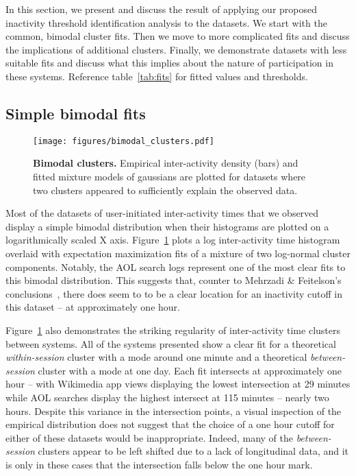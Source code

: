 In this section, we present and discuss the result of applying our proposed inactivity threshold identification analysis to the datasets.  We start with the common, bimodal cluster fits.  Then we move to more complicated fits and discuss the implications of additional clusters.  Finally, we demonstrate datasets with less suitable fits and discuss what this implies about the nature of participation in these systems.  Reference table~\ref{tab:fits} for fitted values and thresholds.

\subsection{Simple bimodal fits}
\begin{figure}
\centering
\texttt{[image: figures/bimodal\_clusters.pdf]}
\caption{
    \textbf{Bimodal clusters.} Empirical inter-activity density (bars) and fitted mixture models of gaussians are plotted for datasets where two clusters appeared to sufficiently explain the observed data.
}
\label{fig:bimodal_clusters}
\end{figure}
Most of the datasets of user-initiated inter-activity times that we observed display a simple bimodal distribution when their histograms are plotted on a logarithmically scaled X axis.  Figure~\ref{fig:bimodal_clusters} plots a log inter-activity time histogram overlaid with expectation maximization fits of a mixture of two log-normal cluster components.  Notably, the AOL search logs represent one of the most clear fits to this bimodal distribution.  This suggests that, counter to Mehrzadi \& Feitelson's conclusions~\cite{mehrzadi2012onextracting}, there does seem to to be a clear location for an inactivity cutoff in this dataset -- at approximately one hour.

Figure~\ref{fig:bimodal_clusters} also demonstrates the striking regularity of inter-activity time clusters between systems.  All of the systems presented show a clear fit for a theoretical \emph{within-session} cluster with a mode around one minute and a theoretical \emph{between-session} cluster with a mode at one day.  Each fit intersects at approximately one hour -- with Wikimedia app views displaying the lowest intersection at 29 minutes while AOL searches display the highest intersect at 115 minutes -- nearly two hours.   Despite this variance in the intersection points, a visual inspection of the empirical distribution does not suggest that the choice of a one hour cutoff for either of these datasets would be inappropriate.  Indeed, many of the \emph{between-session} clusters appear to be left shifted due to a lack of longitudinal data, and it is only in these cases that the intersection falls below the one hour mark.

